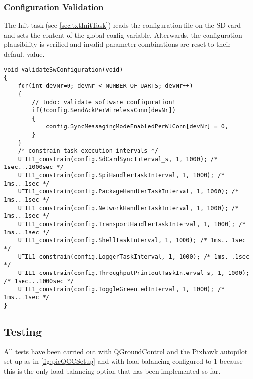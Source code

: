 \subsubsection{Configuration Validation}
The Init task (see \autoref{sec:txtInitTask}) reads the configuration file on the SD card and sets the content of the global config variable. Afterwards, the configuration plausibility is verified and invalid parameter combinations are reset to their default value.
\begin{lstlisting}
void validateSwConfiguration(void)
{
    for(int devNr=0; devNr < NUMBER_OF_UARTS; devNr++)
    {
        // todo: validate software configuration!
        if(!config.SendAckPerWirelessConn[devNr])
        {
            config.SyncMessagingModeEnabledPerWlConn[devNr] = 0;
        }
    }
    /* constrain task execution intervals */
    UTIL1_constrain(config.SdCardSyncInterval_s, 1, 1000); /* 1sec...1000sec */
    UTIL1_constrain(config.SpiHandlerTaskInterval, 1, 1000); /* 1ms...1sec */
    UTIL1_constrain(config.PackageHandlerTaskInterval, 1, 1000); /* 1ms...1sec */
    UTIL1_constrain(config.NetworkHandlerTaskInterval, 1, 1000); /* 1ms...1sec */
    UTIL1_constrain(config.TransportHandlerTaskInterval, 1, 1000); /* 1ms...1sec */
    UTIL1_constrain(config.ShellTaskInterval, 1, 1000); /* 1ms...1sec */
    UTIL1_constrain(config.LoggerTaskInterval, 1, 1000); /* 1ms...1sec */
    UTIL1_constrain(config.ThroughputPrintoutTaskInterval_s, 1, 1000); /* 1sec...1000sec */
    UTIL1_constrain(config.ToggleGreenLedInterval, 1, 1000); /* 1ms...1sec */
}
\end{lstlisting} 
%
%
%
%
%
%
%
%
%
%
%
\subsection{Testing}
All tests have been carried out with QGroundControl and the Pixhawk autopilot set up as in \autoref{fig:picQGCSetup} and with load balancing configured to 1 because this is the only load balancing option that has been implemented so far.
%
